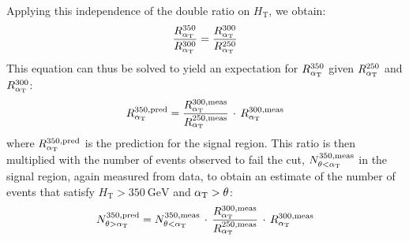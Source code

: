Applying this independence of the double ratio on $H_{\mathrm{T}}$, we
obtain:
\begin{equation}\label{equ:ratio_predicted}
  \frac{R_{\alpha_{\mathrm{T}}}^{350}}{R_{\alpha_{\mathrm{T}}}^{300}} = 
  \frac{R_{\alpha_{\mathrm{T}}}^{300}}{R_{\alpha_{\mathrm{T}}}^{250}} 
\end{equation}
This equation can thus be solved to yield an expectation for
$R_{\alpha_{\mathrm{T}}}^{350}$ given $R_{\alpha_{\mathrm{T}}}^{250}$ and $R_{\alpha_{\mathrm{T}}}^{300}$:
\begin{equation}\label{equ:ratio_predicted}
  R_{\alpha_{\mathrm{T}}}^{350,\mathrm{pred}} = 
  \frac{R_{\alpha_{\mathrm{T}}}^{300,\mathrm{meas}}}{R_{\alpha_{\mathrm{T}}}^{250,\mathrm{meas}}} 
  \,\cdot\, 
  R_{\alpha_{\mathrm{T}}}^{300,\mathrm{meas}}
\end{equation}
where $R_{\alpha_{\mathrm{T}}}^{350,\mathrm{pred}}$ is the prediction for the signal
region. This ratio is then multiplied with the number of events
observed to fail the \aT cut, $N_{\theta<\alpha_{\mathrm{T}}}^{350,\mathrm{meas}}$ in
the signal region, again measured from data, to obtain an estimate of
the number of events that satisfy $H_{\mathrm{T}} > 350~\mathrm{GeV}$
and $\alpha_{\mathrm{T}} > \theta$:
\begin{equation}\label{equ:number_predicted}
  N_{\theta>\alpha_{\mathrm{T}}}^{350,\mathrm{pred}} = 
  N_{\theta<\alpha_{\mathrm{T}}}^{350,\mathrm{meas}} 
  \,\cdot\, 
  \frac{R_{\alpha_{\mathrm{T}}}^{300,\mathrm{meas}}}{R_{\alpha_{\mathrm{T}}}^{250,\mathrm{meas}}} 
  \,\cdot\, 
  R_{\alpha_{\mathrm{T}}}^{300,\mathrm{meas}}
\end{equation}

